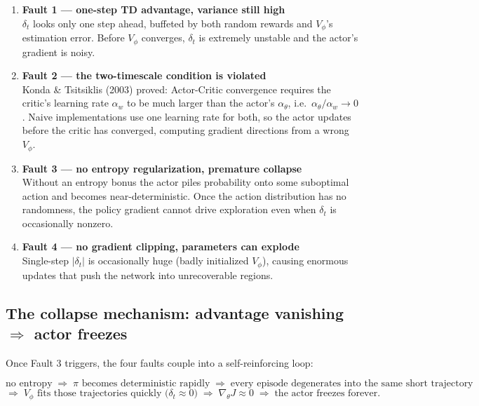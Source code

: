 \documentclass{article}
\begin{document}
\begin{enumerate}
  \item \textbf{Fault 1 --- one-step TD advantage, variance still high}\\
        $\delta_t$ looks only one step ahead, buffeted by both random rewards and $V_\phi$'s estimation error. Before $V_\phi$ converges, $\delta_t$ is extremely unstable and the actor's gradient is noisy.

  \item \textbf{Fault 2 --- the two-timescale condition is violated}\\
        Konda \& Tsitsiklis (2003) proved: Actor-Critic convergence requires the critic's learning rate $\alpha_w$ to be much larger than the actor's $\alpha_\theta$, i.e.\ $\alpha_\theta / \alpha_w \to 0$. Naive implementations use one learning rate for both, so the actor updates before the critic has converged, computing gradient directions from a wrong $V_\phi$.

  \item \textbf{Fault 3 --- no entropy regularization, premature collapse}\\
        Without an entropy bonus the actor piles probability onto some suboptimal action and becomes near-deterministic. Once the action distribution has no randomness, the policy gradient cannot drive exploration even when $\delta_t$ is occasionally nonzero.

  \item \textbf{Fault 4 --- no gradient clipping, parameters can explode}\\
        Single-step $|\delta_t|$ is occasionally huge (badly initialized $V_\phi$), causing enormous updates that push the network into unrecoverable regions.
\end{enumerate}

\subsection*{The collapse mechanism: advantage vanishing $\Rightarrow$ actor freezes}

Once Fault 3 triggers, the four faults couple into a self-reinforcing loop:

\[
\text{no entropy} \;\Rightarrow\; \pi \text{ becomes deterministic rapidly}
\;\Rightarrow\; \text{every episode degenerates into the same short trajectory}
\]
\[
\Rightarrow\; V_\phi \text{ fits those trajectories quickly (} \delta_t \approx 0 \text{)}
\;\Rightarrow\; \nabla_\theta J \approx 0 \;\Rightarrow\; \text{the actor freezes forever.}
\]
\end{document}
